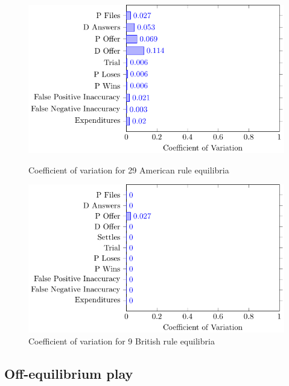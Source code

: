 \documentclass{article}
\begin{document}
\begin{figure}
    \centering
    \begin{minipage}{0.48\textwidth}
        \centering
        \includegraphics[scale=0.5, trim={0in 0in 0in 0in}, clip]{../Figures/Baseline multiple equilibria (American).pdf}
		\caption{Coefficient of variation for 29 American rule equilibria}
\label{fig:baseline_multieq_american}
    \end{minipage}\hfill
    \begin{minipage}{0.48\textwidth}
        \centering
		\includegraphics[scale=0.5, trim={0in 0in 0in 0in}, clip]{../Figures/Baseline multiple equilibria (British).pdf}
		\caption{Coefficient of variation for 9 British rule equilibria}
		\label{fig:baseline_multieq_british}
    \end{minipage}
\end{figure}

\subsection{Off-equilibrium play}
\end{document}
